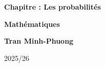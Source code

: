 \begin{titlepage}
     \begin{center}
       \vspace*{1cm}
        \huge
       \textbf{Chapitre  \hspace{1cm} : Les probabilités}\\ %
              \vspace{1.5cm}


       \Large\textbf{Mathématiques}
 
      
       \vspace{15cm}
        \large
       
       \textbf{Tran Minh-Phuong}
 
       \vfill
 
      
 
       \vspace{0.8cm}
 
       
        \normalsize
       
       2025/26
 
   \end{center}
\end{titlepage}
